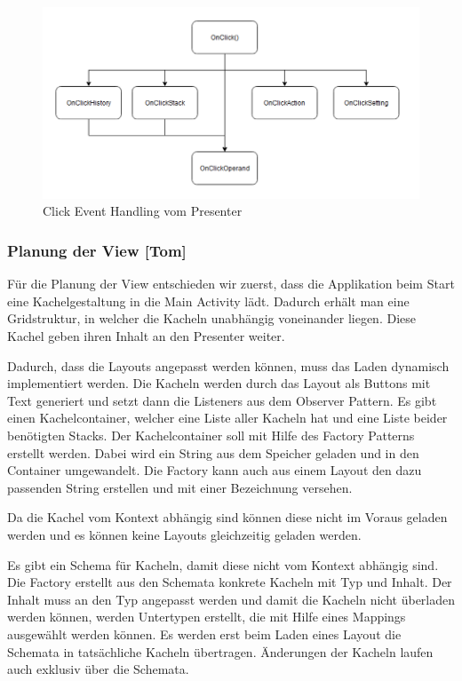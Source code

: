 
\begin{figure}[!h]
	\includegraphics[width=1\columnwidth]{img/click-event-handling-vom-presenter}
	\caption[Click Event Handling vom Presenter]{Click Event Handling vom Presenter\footnotemark}
\end{figure}


\clearpage

\subsubsection{Planung der View [Tom]}

Für die Planung der View entschieden wir zuerst, dass die Applikation beim Start eine Kachelgestaltung in die Main Activity lädt. Dadurch erhält man eine Gridstruktur, in welcher die Kacheln unabhängig voneinander liegen. Diese Kachel geben ihren Inhalt an den Presenter weiter.

Dadurch, dass die Layouts angepasst werden können, muss das Laden dynamisch implementiert werden. Die Kacheln werden durch das Layout als Buttons mit Text generiert und setzt dann die Listeners aus dem Observer Pattern. Es gibt einen Kachelcontainer, welcher eine Liste aller Kacheln hat und eine Liste beider benötigten Stacks. Der Kachelcontainer soll mit Hilfe des Factory Patterns erstellt werden. Dabei wird ein String aus dem Speicher geladen und in den Container umgewandelt. Die Factory kann auch aus einem Layout den dazu passenden String erstellen und mit einer Bezeichnung versehen. 

Da die Kachel vom Kontext abhängig sind können diese nicht im Voraus geladen werden und es können keine Layouts gleichzeitig geladen werden. 

Es gibt ein Schema für Kacheln, damit diese nicht vom Kontext abhängig sind. Die Factory erstellt aus den Schemata konkrete Kacheln mit Typ und Inhalt. Der Inhalt muss an den Typ angepasst werden und damit die Kacheln nicht überladen werden können, werden Untertypen erstellt, die mit Hilfe eines Mappings ausgewählt werden können. Es werden erst beim Laden eines Layout die Schemata in tatsächliche Kacheln übertragen. Änderungen der Kacheln laufen auch exklusiv über die Schemata.

